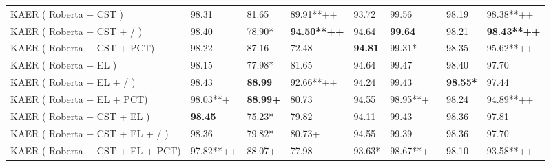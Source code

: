 \begin{table*}[!ht]
{\begin{tabular}{l|ll|llll|l}
KAER ( Roberta + CST )           & 98.31                             & 81.65                       & 89.91**++                   & 93.72                       & 99.56                   & 98.19                             & 98.38**++                            \\
KAER ( Roberta + CST + / )       & 98.40                              & 78.90*                       & \textbf{94.50**++}           & 94.64                       & \textbf{99.64}          & 98.21                             & \textbf{98.43**++}                   \\
KAER ( Roberta + CST + PCT)      & 98.22                             & 87.16                       & 72.48                       & \textbf{94.81}              & 99.31*                  & 98.35                             & 95.62**++                            \\
KAER ( Roberta + EL )            & 98.15                             & 77.98*                      & 81.65                       & 94.64                       & 99.47                   & 98.40                              & 97.70                                 \\
KAER ( Roberta + EL + / )        & 98.43                   & \textbf{88.99}              & 92.66**++                   & 94.24                       & 99.43                   & \textbf{98.55*}                   & 97.44                                \\
KAER ( Roberta + EL + PCT)       & 98.03**+                          & \textbf{88.99+}             & 80.73                       & 94.55                       & 98.95**+                & 98.24                             & 94.89**++                            \\
KAER ( Roberta + CST + EL )      & \textbf{98.45}                    & 75.23*                      & 79.82                       & 94.11                       & 99.43                   & 98.36                             & 97.81                                \\
KAER ( Roberta + CST + EL + / )  & 98.36                             & 79.82*                      & 80.73+                      & 94.55                       & 99.39                   & 98.36                             & 97.70                                 \\
KAER ( Roberta + CST + EL + PCT) & 97.82**++                         & 88.07+                      & 77.98                       & 93.63*                      & 98.67**++               & 98.10+                             & 93.58**++                            \\ \hline

\end{tabular}}
\end{table*}
